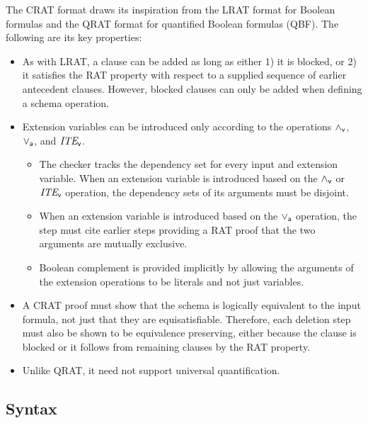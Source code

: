 \documentclass{llncs}
\newcommand{\pand}{\mathbin{\land_{\sf v}}}
\newcommand{\por}{\mathbin{\lor_{\sf a}}}
\newcommand{\pite}{\mbox{\it ITE}_{\sf v}}
\begin{document}
The CRAT format draws its inspiration from the LRAT format for Boolean formulas and the
QRAT format for
quantified Boolean formulas (QBF).  The following are its key properties:
\begin{itemize}
\item As with LRAT, a clause can be added as long as either 1) it is
  blocked, or 2) it satisfies the RAT property with respect to a supplied sequence
  of earlier antecedent clauses.  However, blocked clauses can only be added when defining a schema operation.
\item  Extension variables can be introduced only according to the operations $\pand$, $\por$, and $\pite$.
\begin{itemize}
\item The checker tracks the dependency set for every input and
  extension variable.  When an extension variable is introduced based
  on the $\pand$ or $\pite$ operation, the dependency sets of its arguments must
  be disjoint.
\item When an extension variable is introduced based on the $\por$
  operation, the step must cite earlier steps providing a RAT proof
  that the two arguments are mutually exclusive.
\item Boolean complement is provided implicitly by allowing the
  arguments of the extension operations to be literals and not just
  variables.
\end{itemize}
\item A CRAT proof must show that the schema is logically equivalent
  to the input formula, not just that they are equisatisfiable.
  Therefore, each deletion step must also be shown to be equivalence
  preserving, either because the clause is blocked or it follows from
  remaining clauses by the RAT property.
\item Unlike QRAT, it need not support universal quantification.
\end{itemize}

\subsection{Syntax}
\end{document}
